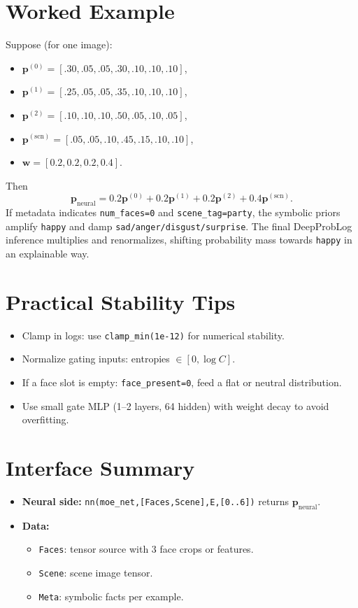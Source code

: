 \documentclass[12pt]{article}
\begin{document}
\section{Worked Example}
Suppose (for one image):
\begin{itemize}
  \item $\bm{p}^{(0)}=[.30,.05,.05,.30,.10,.10,.10]$,
  \item $\bm{p}^{(1)}=[.25,.05,.05,.35,.10,.10,.10]$,
  \item $\bm{p}^{(2)}=[.10,.10,.10,.50,.05,.10,.05]$,
  \item $\bm{p}^{(\text{scn})}=[.05,.05,.10,.45,.15,.10,.10]$,
  \item $\bm{w}=[0.2,0.2,0.2,0.4]$.
\end{itemize}
Then
\[
\bm{p}_{\text{neural}}
= 0.2\bm{p}^{(0)}+0.2\bm{p}^{(1)}+0.2\bm{p}^{(2)}+0.4\bm{p}^{(\text{scn})}.
\]
If metadata indicates \texttt{num\_faces=0} and \texttt{scene\_tag=party},
the symbolic priors amplify \texttt{happy} and damp \texttt{sad/anger/disgust/surprise}.
The final DeepProbLog inference multiplies and renormalizes, shifting probability mass towards \texttt{happy} in an explainable way.

\section{Practical Stability Tips}
\begin{itemize}[leftmargin=1.2em]
  \item Clamp in logs: use \texttt{clamp\_min(1e-12)} for numerical stability.
  \item Normalize gating inputs: entropies $\in[0,\log C]$.
  \item If a face slot is empty: \texttt{face\_present=0}, feed a flat or neutral distribution.
  \item Use small gate MLP (1–2 layers, 64 hidden) with weight decay to avoid overfitting.
\end{itemize}

\section{Interface Summary}
\begin{itemize}[leftmargin=1.2em]
  \item \textbf{Neural side:} \texttt{nn(moe\_net,[Faces,Scene],E,[0..6])} returns $\bm{p}_{\text{neural}}$.
  \item \textbf{Data:} 
    \begin{itemize}
      \item \texttt{Faces}: tensor source with 3 face crops or features.
      \item \texttt{Scene}: scene image tensor.
      \item \texttt{Meta}: symbolic facts per example.
    \end{itemize}
\end{itemize}
\end{document}

